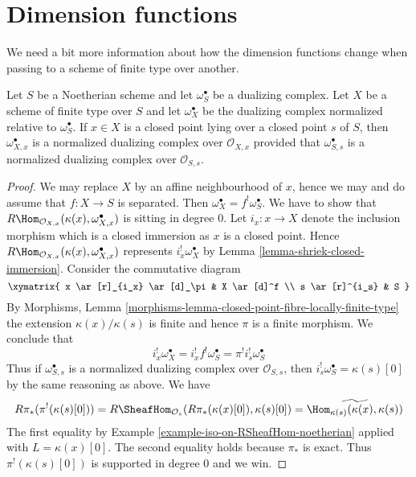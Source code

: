 \section{Dimension functions}
\label{section-dimension-functions}

\noindent
We need a bit more information about how the dimension functions change
when passing to a scheme of finite type over another.

\begin{lemma}
\label{lemma-good-dualizing-normalized}
Let $S$ be a Noetherian scheme and let $\omega_S^\bullet$ be a
dualizing complex. Let $X$ be a scheme of finite type over $S$ and let
$\omega_X^\bullet$ be the dualizing complex normalized relative
to $\omega_S^\bullet$. If $x \in X$ is a closed point lying over
a closed point $s$ of $S$, then $\omega_{X, x}^\bullet$
is a normalized dualizing complex over $\mathcal{O}_{X, x}$
provided that $\omega_{S, s}^\bullet$ is a normalized dualizing
complex over $\mathcal{O}_{S, s}$.
\end{lemma}

\begin{proof}
We may replace $X$ by an affine neighbourhood of $x$, hence we may
and do assume that $f : X \to S$ is separated.
Then $\omega_X^\bullet = f^!\omega_S^\bullet$. We have to show that
$R\Hom_{\mathcal{O}_{X, x}}(\kappa(x), \omega_{X, x}^\bullet)$
is sitting in degree $0$. Let $i_x : x \to X$ denote the inclusion
morphism which is a closed immersion as $x$ is a closed point.
Hence $R\Hom_{\mathcal{O}_{X, x}}(\kappa(x), \omega_{X, x}^\bullet)$
represents $i_x^!\omega_X^\bullet$ by
Lemma \ref{lemma-shriek-closed-immersion}.
Consider the commutative diagram
$$
\xymatrix{
x \ar[r]_{i_x} \ar[d]_\pi & X \ar[d]^f \\
s \ar[r]^{i_s} & S
}
$$
By Morphisms, Lemma
\ref{morphisms-lemma-closed-point-fibre-locally-finite-type}
the extension $\kappa(x)/\kappa(s)$ is finite and hence
$\pi$ is a finite morphism. We conclude that
$$
i_x^!\omega_X^\bullet = i_x^! f^! \omega_S^\bullet =
\pi^! i_s^! \omega_S^\bullet
$$
Thus if $\omega_{S, s}^\bullet$ is a normalized dualizing complex
over $\mathcal{O}_{S, s}$, then $i_s^!\omega_S^\bullet = \kappa(s)[0]$
by the same reasoning as above. We have
$$
R\pi_*(\pi^!(\kappa(s)[0])) =
R\SheafHom_{\mathcal{O}_s}(R\pi_*(\kappa(x)[0]), \kappa(s)[0]) =
\widetilde{\Hom_{\kappa(s)}(\kappa(x), \kappa(s))}
$$
The first equality by Example \ref{example-iso-on-RSheafHom-noetherian}
applied with $L = \kappa(x)[0]$. The second equality holds because
$\pi_*$ is exact.
Thus $\pi^!(\kappa(s)[0])$ is supported in degree $0$ and we win.
\end{proof}

